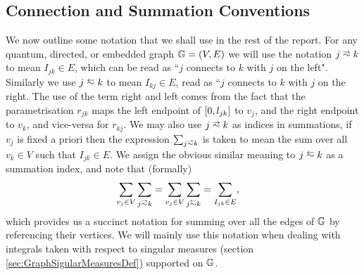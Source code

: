 \subsection{Connection and Summation Conventions} \label{sec:GraphSimDefinitions}
We now outline some notation that we shall use in the rest of the report.
For any quantum, directed, or embedded graph $\mathbb{G}=\left( V,E \right)$ we will use the notation $j\conLeft k$ to mean $I_{jk}\in E$, which can be read as ``$j$ connects to $k$ with $j$ on the left".
Similarly we use $j\conRight k$ to mean $I_{kj}\in E$, read as ``$j$ connects to $k$ with $j$ on the right.
The use of the term right and left comes from the fact that the parametrisation $r_{jk}$ maps the left endpoint of $\left[ 0,l_{jk} \right]$ to $v_j$, and the right endpoint to $v_k$, and vice-versa for $r_{kj}$.
We may also use $j\conLeft k$ as indices in summations, if $v_j$ is fixed a priori then the expression $\sum_{j\conLeft k}$ is taken to mean the sum over all $v_k\in V$ such that $I_{jk}\in E$.
We assign the obvious similar meaning to $j\conRight k$ as a summation index, and note that (formally)
\begin{align*}
	\sum_{v_j\in V}\sum_{j\conLeft k} &= \sum_{v_j\in V}\sum_{j\conRight k} = \sum_{I_{jk}\in E},
\end{align*}
which provides us a succinct notation for summing over all the edges of $\mathbb{G}$ by referencing their vertices.
We will mainly use this notation when dealing with integrals taken with respect to singular measures (section \ref{sec:GraphSigularMeasuresDef}) supported on $\mathbb{G}$.

